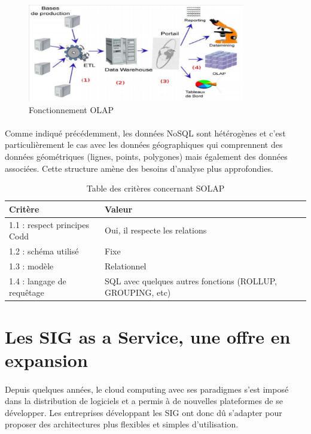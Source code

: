 \begin{figure}[htp]
  \centering
  \includegraphics[width=95mm]{src_img/fonctionnementOLAP.png}
  \caption{Fonctionnement OLAP \supercite{fonctionnementSOLAP}}
  \label{fig:olap}
\end{figure}
\paragraph{}Comme indiqué précédemment, les données NoSQL sont hétérogènes et c’est particulièrement le cas avec les données géographiques qui comprennent des données géométriques (lignes, points, polygones) mais également des données associées. Cette structure amène des besoins d’analyse\cite{solap} plus approfondies.

\begin{table}[h!]
    \centering
	\begin{tabular}{|p{5cm}|p{7cm}|} 
  	\hline
  	\textbf{Critère} & \textbf{Valeur} \\
  	\hline
  	1.1 : respect principes Codd & Oui, il respecte les relations \\
  	\hline
  	1.2 : schéma utilisé & Fixe \\
  	\hline
  	1.3 : modèle & Relationnel \\
  	\hline
  	1.4 : langage de requêtage & SQL avec quelques autres fonctions (ROLLUP, GROUPING, etc)  \\
  	\hline
	\end{tabular}
    \caption{Table des critères concernant SOLAP}
    \label{tab:critere-solap}
\end{table}

\section{Les SIG as a Service, une offre en expansion}
\paragraph{}Depuis quelques années, le cloud computing avec ses paradigmes s'est imposé dans la distribution de logiciels et a permis à de nouvelles plateformes de se développer. Les entreprises développant les SIG ont donc dû s'adapter pour proposer des architectures plus flexibles et simples d'utilisation.

